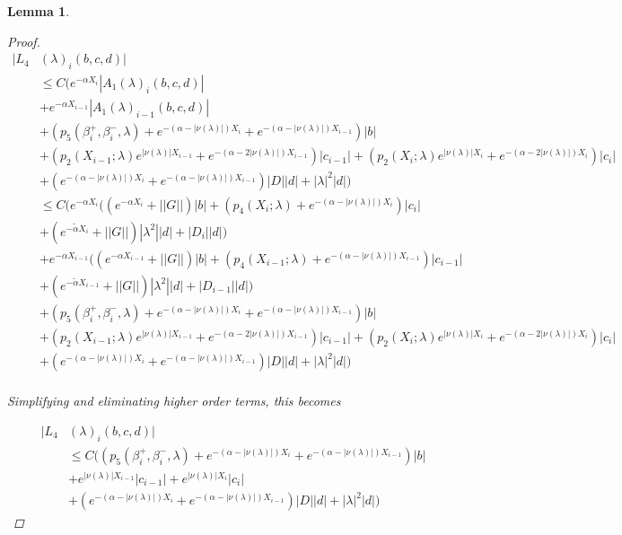 \documentclass[12pt]{article}
\newtheorem{lemma}{Lemma}
\begin{document}
\begin{lemma}
\begin{proof}
\begin{align*}
|L_4&(\lambda)_i(b, c, d)|\\
&\leq C \Big( e^{-\alpha X_i} |A_1(\lambda)_i(b, c, d)| \\
&+  e^{-\alpha X_{i-1}} |A_1(\lambda)_{i-1}(b, c, d)| \\
&+ (p_5(\beta_i^+, \beta_i^-, \lambda) + e^{-(\alpha - |\nu(\lambda)|) X_i} + e^{-(\alpha - |\nu(\lambda)|) X_{i-1}}) |b| \\
&+ (p_2(X_{i-1}; \lambda)e^{|\nu(\lambda)|X_{i-1}} + e^{-(\alpha - 2 |\nu(\lambda)|) X_{i-1}}) |c_{i-1}| + (p_2(X_i; \lambda)e^{|\nu(\lambda)|X_i} + e^{-(\alpha - 2 |\nu(\lambda)|) X_i})|c_i| \\
&+ (e^{-(\alpha - |\nu(\lambda)|) X_i} + e^{-(\alpha - |\nu(\lambda)|) X_{i-1}})|D||d| + |\lambda|^2|d|
\Big) \\
&\leq C \Big( e^{-\alpha X_i} ( (e^{-\alpha X_i} + ||G||) |b| + ( p_4(X_i; \lambda) + e^{-(\alpha - |\nu(\lambda)|)X_i} )|c_i| \\
&+ (e^{-\tilde{\alpha} X_i} + ||G||) |\lambda^2| |d| + |D_i||d| ) \\
&+ e^{-\alpha X_{i-1}} ( (e^{-\alpha X_{i-1}} + ||G||) |b| + ( p_4(X_{i-1}; \lambda) + e^{-(\alpha - |\nu(\lambda)|)X_{i-1}} )|c_{i-1}| \\
&+ (e^{-\tilde{\alpha} X_{i-1}} + ||G||) |\lambda^2| |d| + |D_{i-1}||d| ) \\
&+ (p_5(\beta_i^+, \beta_i^-, \lambda) + e^{-(\alpha - |\nu(\lambda)|) X_i} + e^{-(\alpha - |\nu(\lambda)|) X_{i-1}}) |b| \\
&+ (p_2(X_{i-1}; \lambda)e^{|\nu(\lambda)|X_{i-1}} + e^{-(\alpha - 2 |\nu(\lambda)|) X_{i-1}}) |c_{i-1}| + (p_2(X_i; \lambda)e^{|\nu(\lambda)|X_i} + e^{-(\alpha - 2 |\nu(\lambda)|) X_i})|c_i| \\
&+ (e^{-(\alpha - |\nu(\lambda)|) X_i} + e^{-(\alpha - |\nu(\lambda)|) X_{i-1}})|D||d| + |\lambda|^2|d|
\Big) \\
\end{align*}

Simplifying and eliminating higher order terms, this becomes

\begin{align*}
|L_4&(\lambda)_i(b, c, d)|\\
&\leq C \Big(
(p_5(\beta_i^+, \beta_i^-, \lambda) + e^{-(\alpha - |\nu(\lambda)|) X_i} + e^{-(\alpha - |\nu(\lambda)|) X_{i-1}}) |b| \\
&+ e^{|\nu(\lambda)|X_{i-1}}|c_{i-1}| + e^{|\nu(\lambda)|X_i} |c_i| \\
&+ (e^{-(\alpha - |\nu(\lambda)|) X_i} + e^{-(\alpha - |\nu(\lambda)|) X_{i-1}})|D||d|+ |\lambda|^2|d|
\Big)
\end{align*}


\end{proof}
\end{lemma}
\end{document}
